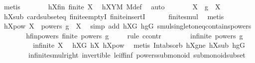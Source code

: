 \begin{isabellebody}
\ metis\isanewline
\ \ \ \ \isamarkupfalse%
\ \isamarkupfalse%
\ hXfin{\isacharcolon}{\kern0pt}\ {\isachardoublequoteopen}finite\ X{\isachardoublequoteclose}\ \isamarkupfalse%
\ hXYM\ M{\isacharunderscore}{\kern0pt}def\ \isamarkupfalse%
\ auto\isanewline
\ \ \ \ \isamarkupfalse%
\ \isamarkupfalse%
\ {\isachardoublequoteopen}X\ {\isasymcdots}\ {\isacharbraceleft}{\kern0pt}g{\isacharbraceright}{\kern0pt}\ {\isacharequal}{\kern0pt}\ X{\isachardoublequoteclose}\ \isamarkupfalse%
\ hXsub\ card{\isacharunderscore}{\kern0pt}subset{\isacharunderscore}{\kern0pt}eq\ finite{\isachardot}{\kern0pt}emptyI\ finite{\isachardot}{\kern0pt}insertI\isanewline
\ \ \ \ \ \ finite{\isacharunderscore}{\kern0pt}smul\ \isamarkupfalse%
\ metis\isanewline
\ \ \ \ \isamarkupfalse%
\ \isamarkupfalse%
\ hXpow{\isacharcolon}{\kern0pt}\ {\isachardoublequoteopen}X\ {\isasymcdots}\ {\isacharparenleft}{\kern0pt}powers\ g{\isacharparenright}{\kern0pt}\ {\isacharequal}{\kern0pt}\ X{\isachardoublequoteclose}\ \isamarkupfalse%
\ {\isacharparenleft}{\kern0pt}simp\ add{\isacharcolon}{\kern0pt}\ hXG\ hgG\ smul{\isacharunderscore}{\kern0pt}singleton{\isacharunderscore}{\kern0pt}eq{\isacharunderscore}{\kern0pt}contains{\isacharunderscore}{\kern0pt}powers{\isacharparenright}{\kern0pt}\isanewline
\ \ \ \ \isamarkupfalse%
\ \isamarkupfalse%
\ hfinpowers{\isacharcolon}{\kern0pt}\ {\isachardoublequoteopen}finite\ {\isacharparenleft}{\kern0pt}powers\ g{\isacharparenright}{\kern0pt}{\isachardoublequoteclose}\isanewline
\ \ \ \ \isamarkupfalse%
{\isacharparenleft}{\kern0pt}rule\ ccontr{\isacharparenright}{\kern0pt}\isanewline
\ \ \ \ \ \ \isamarkupfalse%
\ {\isachardoublequoteopen}infinite\ {\isacharparenleft}{\kern0pt}powers\ g{\isacharparenright}{\kern0pt}{\isachardoublequoteclose}\isanewline
\ \ \ \ \ \ \isamarkupfalse%
\ \isamarkupfalse%
\ {\isachardoublequoteopen}infinite\ X{\isachardoublequoteclose}\ \isamarkupfalse%
\ hXG\ hX{}\ hXpow\ \isamarkupfalse%
\ {\isacharparenleft}{\kern0pt}metis\ Int{\isacharunderscore}{\kern0pt}absorb{}\ hXgne\ hXsub\ hgG\ \isanewline
\ \ \ \ \ \ \ \ infinite{\isacharunderscore}{\kern0pt}smul{\isacharunderscore}{\kern0pt}right\ invertible\ le{\isacharunderscore}{\kern0pt}iff{\isacharunderscore}{\kern0pt}inf\ powers{\isacharunderscore}{\kern0pt}submonoid\ submonoid{\isachardot}{\kern0pt}subset{\isacharparenright}{\kern0pt}\isanewline

\end{isabellebody}
